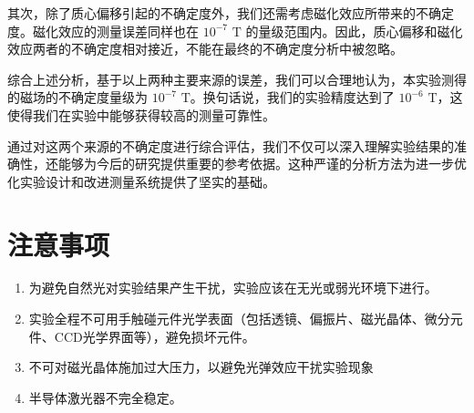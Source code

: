 \documentclass[12pt]{ctexart}
\numberwithin{equation}{section} %
\begin{document}
其次，除了质心偏移引起的不确定度外，我们还需考虑磁化效应所带来的不确定度。磁化效应的测量误差同样也在 $10^{-7} \text{ T}$ 的量级范围内。因此，质心偏移和磁化效应两者的不确定度相对接近，不能在最终的不确定度分析中被忽略。

综合上述分析，基于以上两种主要来源的误差，我们可以合理地认为，本实验测得的磁场的不确定度量级为 $10^{-7} \text{ T}$。换句话说，我们的实验精度达到了 $10^{-6} \text{ T}$，这使得我们在实验中能够获得较高的测量可靠性。

通过对这两个来源的不确定度进行综合评估，我们不仅可以深入理解实验结果的准确性，还能够为今后的研究提供重要的参考依据。这种严谨的分析方法为进一步优化实验设计和改进测量系统提供了坚实的基础。














\section{注意事项}
\begin{enumerate}
\item 为避免自然光对实验结果产生干扰，实验应该在无光或弱光环境下进行。
\item 实验全程不可用手触碰元件光学表面（包括透镜、偏振片、磁光晶体、微分元件、CCD光学界面等），避免损坏元件。
\item 不可对磁光晶体施加过大压力，以避免光弹效应干扰实验现象
\item 半导体激光器不完全稳定。
\end{enumerate}

\end{document}
